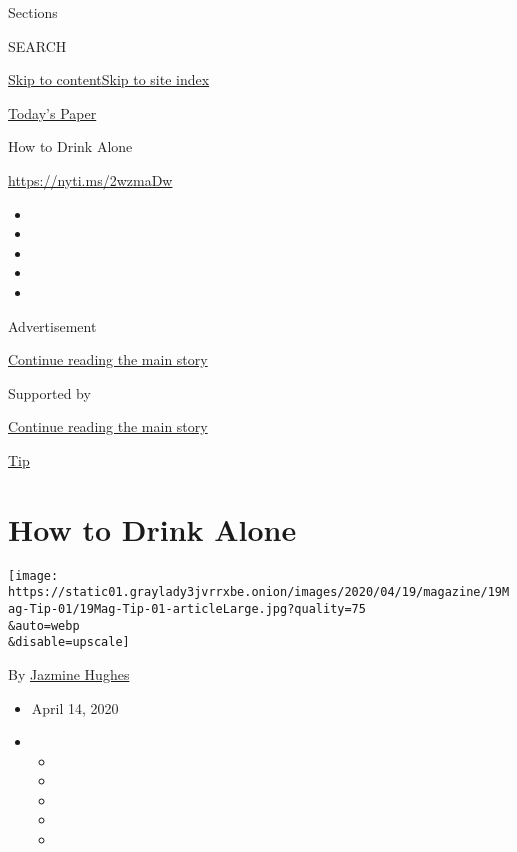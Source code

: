 Sections

SEARCH

\protect\hyperlink{site-content}{Skip to
content}\protect\hyperlink{site-index}{Skip to site index}

\href{https://myaccount.nytimes3xbfgragh.onion/auth/login?response_type=cookie\&client_id=vi}{}

\href{https://www.nytimes3xbfgragh.onion/section/todayspaper}{Today's
Paper}

How to Drink Alone

\url{https://nyti.ms/2wzmaDw}

\begin{itemize}
\item
\item
\item
\item
\item
\end{itemize}

Advertisement

\protect\hyperlink{after-top}{Continue reading the main story}

Supported by

\protect\hyperlink{after-sponsor}{Continue reading the main story}

\href{/column/magazine-tip}{Tip}

\hypertarget{how-to-drink-alone}{%
\section{How to Drink Alone}\label{how-to-drink-alone}}

\texttt{[image: https://static01.graylady3jvrrxbe.onion/images/2020/04/19/magazine/19Mag-Tip-01/19Mag-Tip-01-articleLarge.jpg?quality=75\\\&auto=webp\\\&disable=upscale]}

By \href{https://www.nytimes3xbfgragh.onion/by/jazmine-hughes}{Jazmine
Hughes}

\begin{itemize}
\item
  April 14, 2020
\item
  \begin{itemize}
  \item
  \item
  \item
  \item
  \item
  \end{itemize}
\end{itemize}

